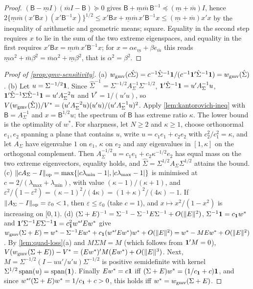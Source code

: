 \begin{proof}
$(\mathsf B-\underline mI)(\overline mI-\mathsf B)\succeq0$ gives
$\mathsf B+\underline m\overline m\,\mathsf B^{-1}\preceq(\underline m+\overline m)I$, hence
$2\{\underline m\overline m(x'\mathsf Bx)(x'\mathsf B^{-1}x)\}^{1/2}\le x'\mathsf Bx+\underline m\overline m\,x'\mathsf B^{-1}x\le(\underline m+\overline m)x'x$
by the inequality of arithmetic and geometric means; square. Equality in the second step requires
$x$ to lie in the sum of the two extreme eigenspaces, and equality in the first requires
$x'\mathsf Bx=\underline m\overline m\,x'\mathsf B^{-1}x$; for $x=\alpha e_{\underline m}+\beta e_{\overline m}$
this reads $\underline m\alpha^2+\overline m\beta^2=\overline m\alpha^2+\underline m\beta^2$, that is
$\alpha^2=\beta^2$.
\end{proof}

\begin{proof}[Proof of \cref{prop:gmv-sensitivity}]
(a) $w_{\mathrm{gmv}}(c\hat\Sigma)=c^{-1}\hat\Sigma^{-1}\mathbf{1}/(c^{-1}\mathbf{1}'\hat\Sigma^{-1}\mathbf{1})=w_{\mathrm{gmv}}(\hat\Sigma)$.
(b) Let $u=\Sigma^{-1/2}\mathbf{1}$. Since $\hat\Sigma^{-1}=\Sigma^{-1/2}A_\Sigma^{-1}\Sigma^{-1/2}$,
$\mathbf{1}'\hat\Sigma^{-1}\mathbf{1}=u'A_\Sigma^{-1}u$, $\mathbf{1}'\hat\Sigma^{-1}\Sigma\hat\Sigma^{-1}\mathbf{1}=u'A_\Sigma^{-2}u$
and $V^*=1/(u'u)$, so
$V(w_{\mathrm{gmv}}(\hat\Sigma))/V^*=(u'A_\Sigma^{-2}u)(u'u)/(u'A_\Sigma^{-1}u)^2$. Apply
\cref{lem:kantorovich-ineq} with $\mathsf B=A_\Sigma^{-1}$ and $x=\mathsf B^{1/2}u$; the spectrum
of $\mathsf B$ has extreme ratio $\kappa$. The lower bound is the optimality of $w^*$. For
sharpness, let $N\ge2$ and $\kappa\ge1$, choose orthonormal $e_1,e_2$ spanning a plane that
contains $u$, write $u=c_1e_1+c_2e_2$ with $c_2^2/c_1^2=\kappa$, and let $A_\Sigma$ have
eigenvalue $1$ on $e_1$, $\kappa$ on $e_2$ and any eigenvalues in $[1,\kappa]$ on the orthogonal
complement. Then $A_\Sigma^{-1/2}u=c_1e_1+c_2\kappa^{-1/2}e_2$ has equal mass on the two extreme
eigenvectors, equality holds, and $\hat\Sigma=\Sigma^{1/2}A_\Sigma\Sigma^{1/2}$ attains the bound.
(c) $\lVert cA_\Sigma-I\rVert_{\mathrm{op}}=\max\{\lvert c\lambda_{\min}-1\rvert,\lvert c\lambda_{\max}-1\rvert\}$ is
minimised at $c=2/(\lambda_{\max}+\lambda_{\min})$, with value $(\kappa-1)/(\kappa+1)$, and
$\varepsilon^2/(1-\varepsilon^2)=(\kappa-1)^2/(4\kappa)=(1+\kappa)^2/(4\kappa)-1$. If
$\lVert A_\Sigma-I\rVert_{\mathrm{op}}=\varepsilon_0<1$, then $\varepsilon\le\varepsilon_0$ (take $c=1$),
and $x\mapsto x^2/(1-x^2)$ is increasing on $[0,1)$.
(d) $(\Sigma+E)^{-1}=\Sigma^{-1}-\Sigma^{-1}E\Sigma^{-1}+O(\lVert E\rVert^2)$, $\Sigma^{-1}\mathbf{1}=c_{\mathbf{1}}w^*$ and
$\mathbf{1}'\Sigma^{-1}E\Sigma^{-1}\mathbf{1}=c_{\mathbf{1}}^2w^{*\prime}Ew^*$ give
$w_{\mathrm{gmv}}(\Sigma+E)=w^*-\Sigma^{-1}Ew^*+c_{\mathbf{1}}(w^{*\prime}Ew^*)w^*+O(\lVert E\rVert^2)=w^*-MEw^*+O(\lVert E\rVert^2)$.
By \cref{lem:quad-loss}(a) and $M\Sigma M=M$ (which follows from $\mathbf{1}'M=0$),
$V(w_{\mathrm{gmv}}(\Sigma+E))-V^*=(Ew^*)'M(Ew^*)+O(\lVert E\rVert^3)$. Next,
$M=\Sigma^{-1/2}(I-uu'/u'u)\Sigma^{-1/2}$ is positive semidefinite with kernel
$\Sigma^{1/2}\operatorname{span}(u)=\operatorname{span}(\mathbf{1})$. Finally $Ew^*=c\mathbf{1}$ iff
$(\Sigma+E)w^*=(1/c_{\mathbf{1}}+c)\mathbf{1}$, and since $w^{*\prime}(\Sigma+E)w^*=1/c_{\mathbf{1}}+c>0$, this holds iff
$w^*=w_{\mathrm{gmv}}(\Sigma+E)$.
\end{proof}

